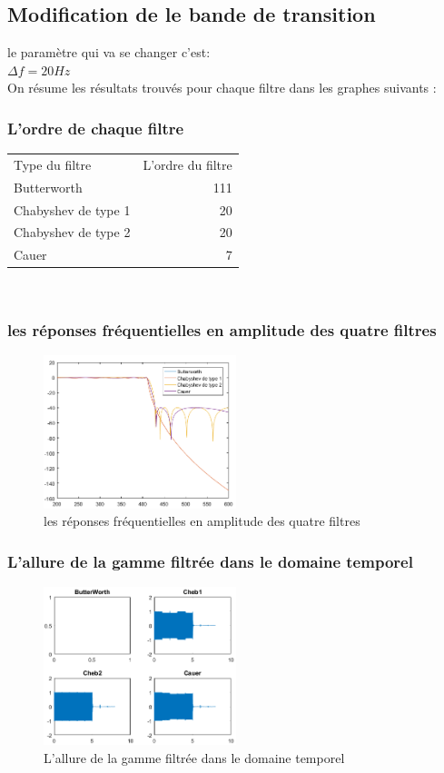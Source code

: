 \documentclass[twoside,twocolumn]{article}
\begin{document}
\subsection{Modification de le bande de transition}
le paramètre qui va se changer c'est:\\
 $\Delta f =20Hz$\\
On résume les résultats trouvés pour chaque filtre dans les graphes suivants :

\subsubsection{L'ordre de chaque filtre}

\begin{tabular}{l|r}
Type du filtre & L'ordre du filtre \\
Butterworth & 111 \\
Chabyshev de type 1 & 20\\
Chabyshev de type 2 & 20\\
Cauer &  7\\
\end{tabular}\\

\subsubsection{les réponses fréquentielles en amplitude des quatre filtres}
\begin{figure}[H]
\centering
\includegraphics[width=0.5\textwidth]{Images/9.png}
\caption{ les réponses fréquentielles en amplitude des quatre filtres}
\end{figure}
\subsubsection{L'allure de la gamme filtrée dans le domaine temporel}
\begin{figure}[H]
\centering
\includegraphics[width=0.5\textwidth]{Images/10.png}
\caption{ L'allure de la gamme filtrée dans le domaine temporel}
\end{figure}
\end{document}
